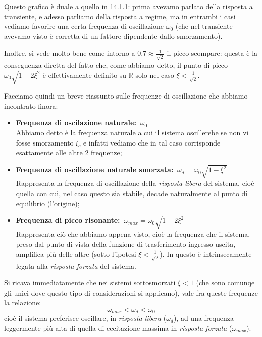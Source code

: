 \documentclass[a4paper,11pt]{article}
\begin{document}
\par\bigskip

Questo grafico è duale a quello in 14.1.1: prima avevamo parlato della risposta a transiente, e adesso parliamo della risposta a regime, ma in entrambi i casi vediamo favorire una certa frequenza di oscillazione $\omega_0$ (che nel transiente avevamo visto è corretta di un fattore dipendente dallo smorzamento).

Inoltre, si vede molto bene come intorno a $0.7 \approx \frac{1}{\sqrt{2}}$ il picco scompare: questa è la conseguenza diretta del fatto che, come abbiamo detto, il punto di picco $\omega_0 \sqrt{1 - 2 \xi^2}$ è effettivamente definito su $\mathbb{R}$ solo nel caso $\xi < \frac{1}{\sqrt{2}}$.

\par\smallskip

Facciamo quindi un breve riassunto sulle frequenze di oscillazione che abbiamo incontrato finora:
\begin{itemize}
	\item \textbf{Frequenza di oscilazione naturale:} $\ \omega_0$ \\
		Abbiamo detto è la frequenza naturale a cui il sistema oscillerebe se non vi fosse smorzamento $\xi$, e infatti vediamo che in tal caso corrisponde esattamente alle altre 2 frequenze; 
	\item \textbf{Frequenza di oscillazione naturale smorzata:} $\ \omega_d = \omega_0 \sqrt{1 - \xi^2}$ \\
		Rappresenta la frequenza di oscillazione della \textit{risposta libera} del sistema, cioè quella con cui, nel caso questo sia stabile, decade naturalmente al punto di equilibrio (l'origine); 
	\item \textbf{Frequenza di picco risonante:} $\ \omega_{max} = \omega_0 \sqrt{1 - 2 \xi^2}$ \\
		Rappresenta ciò che abbiamo appena visto, cioè la frequenza che il sistema, preso dal punto di vista della funzione di trasferimento ingresso-uscita, amplifica più delle altre (sotto l'ipotesi $\xi < \frac{1}{\sqrt2}$). In questo è intrinsecamente legata alla \textit{risposta forzata} del sistema.
\end{itemize}

Si ricava immediatamente che nei sistemi sottosmorzati $\xi < 1$ (che sono comunqe gli unici dove questo tipo di considerazioni si applicano), vale fra queste frequenze la relazione:
$$
\omega_{max} < \omega_d < \omega_0
$$
cioè il sistema preferisce oscillare, in \textit{risposta libera} ($\omega_d$), ad una frequenza leggermente più alta di quella di eccitazione massima in \textit{risposta forzata} ($\omega_{max}$).
\end{document}

